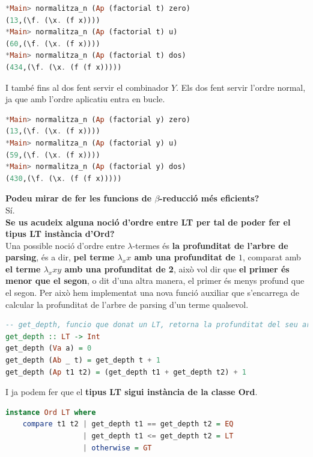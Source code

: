 \documentclass[10pt,a4paper]{article}
\begin{document}
\begin{lstlisting}[language=Haskell]
*Main> normalitza_n (Ap (factorial t) zero)
(13,(\f. (\x. (f x))))
*Main> normalitza_n (Ap (factorial t) u)
(60,(\f. (\x. (f x))))
*Main> normalitza_n (Ap (factorial t) dos)
(434,(\f. (\x. (f (f x)))))
\end{lstlisting}

I també fins al dos fent servir el combinador $Y$. Els dos fent servir l'ordre normal, ja que amb l'ordre aplicatiu entra en bucle.

\begin{lstlisting}[language=Haskell]
*Main> normalitza_n (Ap (factorial y) zero)
(13,(\f. (\x. (f x))))
*Main> normalitza_n (Ap (factorial y) u)
(59,(\f. (\x. (f x))))
*Main> normalitza_n (Ap (factorial y) dos)
(430,(\f. (\x. (f (f x)))))
\end{lstlisting}

\textbf{Podeu mirar de fer les funcions de $\beta$-reducció més eficients?} \\

Sí. \\

\textbf{Se us acudeix alguna noció d’ordre entre LT per tal de poder fer el tipus LT instància d’Ord?} \\

Una possible noció d'ordre entre $\lambda$-termes és \textbf{la profunditat de l'arbre de parsing}, és a dir, \textbf{pel terme $\lambda_x x$ amb una profunditat de $1$}, comparat amb \textbf{el terme $\lambda_x x y$ amb una profunditat de 2}, això vol dir que \textbf{el primer és menor que el segon}, o dit d'una altra manera, el primer és menys profund que el segon. Per això hem implementat una nova funció auxiliar que s'encarrega de calcular la profunditat de l'arbre de parsing d'un terme qualsevol.

\begin{lstlisting}[language=Haskell]
-- get_depth, funcio que donat un LT, retorna la profunditat del seu arbre de parsing
get_depth :: LT -> Int
get_depth (Va a) = 0
get_depth (Ab _ t) = get_depth t + 1
get_depth (Ap t1 t2) = (get_depth t1 + get_depth t2) + 1
\end{lstlisting}

I ja podem fer que el \textbf{tipus LT sigui instància de la classe Ord}.

\begin{lstlisting}[language=Haskell]
instance Ord LT where
    compare t1 t2 | get_depth t1 == get_depth t2 = EQ
                  | get_depth t1 <= get_depth t2 = LT
                  | otherwise = GT
\end{lstlisting}
\end{document}

